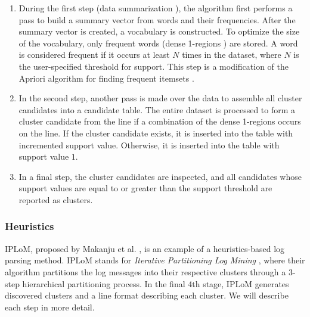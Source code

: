     \begin{enumerate} 
        \item During the first step (data summarization ), the algorithm first performs a pass to build a summary vector from words and their frequencies. After the summary vector is created, a vocabulary is constructed. To optimize the size of the vocabulary, only frequent words (dense 1-regions ) are stored. A word is considered frequent if it occurs at least $N$ times in the dataset, where $N$ is the user-specified threshold for support. This step is a modification of the Apriori algorithm for finding frequent itemsets \cite{Agrawal94fastalgorithms}. 
        
        \item In the second step, another pass is made over the data to assemble all cluster candidates into a candidate table. The entire dataset is processed to form a cluster candidate from the line if a combination of the dense 1-regions occurs on the line. If the cluster candidate exists, it is inserted into the table with incremented support value. Otherwise, it is inserted into the table with support value $1$. 
        
        \item In a final step, the cluster candidates are inspected, and all candidates whose support values are equal to or greater than the support threshold are reported as clusters.
    \end{enumerate}

    
\subsubsection*{Heuristics}
IPLoM, proposed by Makanju et al. \cite{Makanju2009ALA}, is an example of a heuristics-based log parsing method. IPLoM stands for \textit{ Iterative Partitioning Log Mining }, where their algorithm partitions the log messages into their respective clusters through a 3-step hierarchical partitioning process. In the final 4th stage, IPLoM generates discovered clusters and a line format describing each cluster. We will describe each step in more detail.\\

